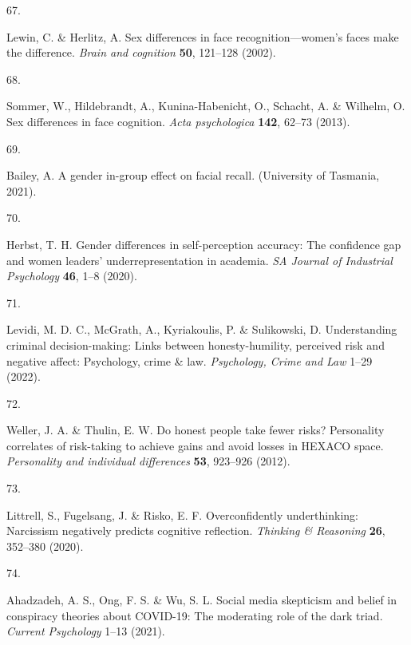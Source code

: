 \documentclass[
  man,floatsintext]{apa6}
\newlength{\cslhangindent}
\newlength{\csllabelwidth}
\newlength{\cslentryspacingunit} %
\newenvironment{CSLReferences}[2] %
 {%
  \setlength{\parindent}{0pt}
  \ifodd #1
  \let\oldpar\par
  \def\par{\hangindent=\cslhangindent\oldpar}
  \fi
  \setlength{\parskip}{#2\cslentryspacingunit}
 }%
 {}
\newcommand{\CSLLeftMargin}[1]{\parbox[t]{\csllabelwidth}{#1}}
\newcommand{\CSLRightInline}[1]{\parbox[t]{\linewidth - \csllabelwidth}{#1}\break}
\begin{document}
\begin{CSLReferences}{0}{0}
\leavevmode{}%
\CSLLeftMargin{67. }%
\CSLRightInline{Lewin, C. \& Herlitz, A. Sex differences in face recognition---women's faces make the difference. \emph{Brain and cognition} \textbf{50}, 121--128 (2002).}

\leavevmode{}%
\CSLLeftMargin{68. }%
\CSLRightInline{Sommer, W., Hildebrandt, A., Kunina-Habenicht, O., Schacht, A. \& Wilhelm, O. Sex differences in face cognition. \emph{Acta psychologica} \textbf{142}, 62--73 (2013).}

\leavevmode{}%
\CSLLeftMargin{69. }%
\CSLRightInline{Bailey, A. A gender in-group effect on facial recall. (University of Tasmania, 2021).}

\leavevmode{}%
\CSLLeftMargin{70. }%
\CSLRightInline{Herbst, T. H. Gender differences in self-perception accuracy: The confidence gap and women leaders' underrepresentation in academia. \emph{SA Journal of Industrial Psychology} \textbf{46}, 1--8 (2020).}

\leavevmode{}%
\CSLLeftMargin{71. }%
\CSLRightInline{Levidi, M. D. C., McGrath, A., Kyriakoulis, P. \& Sulikowski, D. Understanding criminal decision-making: Links between honesty-humility, perceived risk and negative affect: Psychology, crime \& law. \emph{Psychology, Crime and Law} 1--29 (2022).}

\leavevmode{}%
\CSLLeftMargin{72. }%
\CSLRightInline{Weller, J. A. \& Thulin, E. W. Do honest people take fewer risks? Personality correlates of risk-taking to achieve gains and avoid losses in HEXACO space. \emph{Personality and individual differences} \textbf{53}, 923--926 (2012).}

\leavevmode{}%
\CSLLeftMargin{73. }%
\CSLRightInline{Littrell, S., Fugelsang, J. \& Risko, E. F. Overconfidently underthinking: Narcissism negatively predicts cognitive reflection. \emph{Thinking \& Reasoning} \textbf{26}, 352--380 (2020).}

\leavevmode{}%
\CSLLeftMargin{74. }%
\CSLRightInline{Ahadzadeh, A. S., Ong, F. S. \& Wu, S. L. Social media skepticism and belief in conspiracy theories about COVID-19: The moderating role of the dark triad. \emph{Current Psychology} 1--13 (2021).}


\end{CSLReferences}
\end{document}
